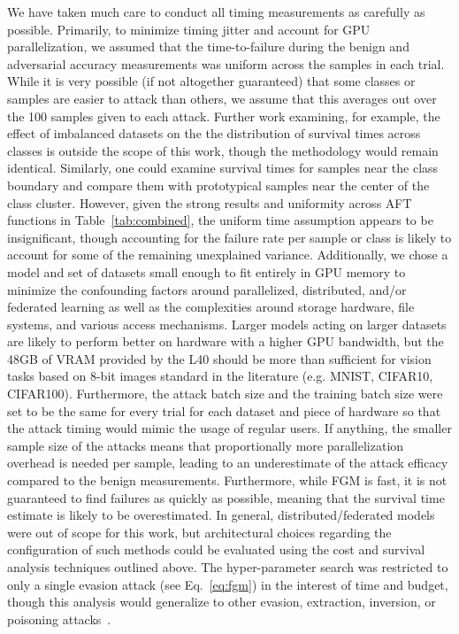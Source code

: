 \documentclass[conference]{IEEEtran}
\begin{document}
We have taken much care to conduct all timing measurements as carefully as possible.
Primarily, to minimize timing jitter and account for GPU parallelization, we assumed that the time-to-failure during the benign and adversarial accuracy measurements was uniform across the samples in each trial. 
While it is very possible (if not altogether guaranteed) that some classes or samples are easier to attack than others, we assume that this averages out over the 100 samples given to each attack. Further work examining, for example, the effect of imbalanced datasets on the the distribution of survival times across classes is outside the scope of this work, though the methodology would remain identical. Similarly, one could examine survival times for samples near the class boundary and compare them with prototypical samples near the center of the class cluster. 
However, given the strong results and uniformity across AFT functions in Table~\ref{tab:combined}, the uniform time assumption appears to be insignificant, though accounting for the failure rate per sample or class is likely to account for some of the remaining unexplained variance. 
Additionally, we chose a model and set of datasets small enough to fit entirely in GPU memory to minimize the confounding factors around parallelized, distributed, and/or federated learning as well as the complexities around storage hardware, file systems, and various access mechanisms. 
Larger models acting on larger datasets are likely to perform better on hardware with a higher GPU bandwidth, but the 48GB of VRAM provided by the L40 should be more than sufficient for vision tasks based on 8-bit images standard in the literature (e.g. MNIST, CIFAR10, CIFAR100). Furthermore, the attack batch size and the training batch size were set to be the same for every trial for each dataset and piece of hardware so that the attack timing would mimic the usage of regular users.
If anything, the smaller sample size of the attacks means that proportionally more parallelization overhead is needed per sample, leading to an underestimate of the attack efficacy compared to the benign measurements. Furthermore, while FGM is fast, it is not guaranteed to find failures as quickly as possible, meaning that the survival time estimate is likely to be overestimated.
In general, distributed/federated models were out of scope for this work, but architectural choices regarding the configuration of such methods could be evaluated using the cost and survival analysis techniques outlined above. 
The hyper-parameter search was restricted to only a single evasion attack (see Eq.~\ref{eq:fgm}) in the interest of time and budget, though this analysis would generalize to other evasion, extraction, inversion, or poisoning attacks~\cite{biggio_evasion_2013,biggio_poisoning_2013,choquette2021label,orekondy2019knockoff}. 
\end{document}
